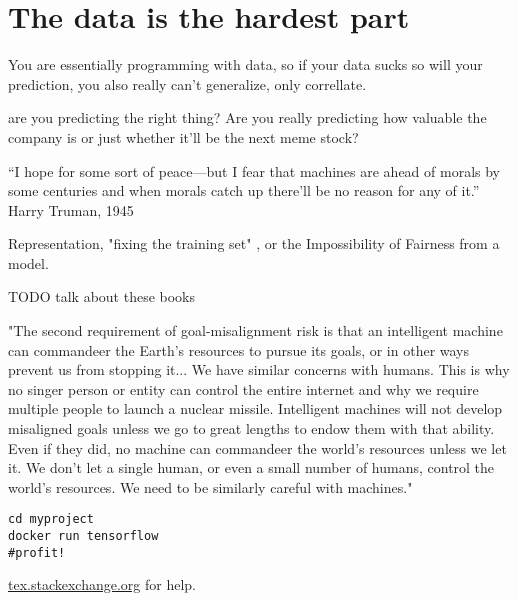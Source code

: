 \setchapterpreamble[u]{\margintoc}
\chapter{The data is the hardest part}

You are essentially programming with data, so if your data sucks so will your prediction, you also really can't generalize, only correllate.

are you predicting the right thing? Are you really predicting how valuable the company is or just whether it'll be the next meme stock?

“I hope for some sort of peace—but I fear that machines are ahead of morals by some centuries and when morals catch up there'll be no reason for any of it.” Harry Truman, 1945 

Representation, "fixing the training set" , or the Impossibility of Fairness from a model.

TODO talk about these books
\cite{Oneil2017}
\cite{Perez2019}
\cite{Blackman2022Jul}
\cite{Christian2020}



"The second requirement of goal-misalignment risk is that an intelligent machine can commandeer the Earth's resources to pursue its goals, or in other ways prevent us from stopping it... We have similar concerns with humans. This is why no singer person or entity can control the entire internet and why we require multiple people to launch a nuclear missile. Intelligent machines will not develop misaligned goals unless we go to great lengths to endow them with that ability. Even if they did, no machine can commandeer the world's resources unless we let it. We don't let a single human, or even a small number of humans, control the world's resources. We need to be similarly careful with machines." \cite{hawkins_2022}

\begin{lstlisting}[style=kaolstplain,linewidth=1.5\textwidth]
cd myproject
docker run tensorflow
#profit!
\end{lstlisting}

\url{tex.stackexchange.org} for help.

